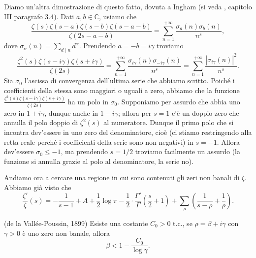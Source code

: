 Diamo un'altra dimostrazione di questo fatto, dovuta a Ingham (si veda \cite{T}, capitolo III paragrafo 3.4). Dati $a,b \in \mathbb{C}$, usiamo che
$$\frac{\zeta(s)\zeta(s-a)\zeta(s-b)\zeta(s-a-b)}{\zeta(2s-a-b)}=\sum_{n=1}^{+\infty} \frac{\sigma_a(n)\sigma_b(n)}{n^s},$$
dove $\displaystyle \sigma_{\alpha}(n)=\sum_{d \mid n} d^{\alpha}$. Prendendo $a=-b=i\gamma$ troviamo
$$\frac{\zeta^2(s)\zeta(s-i\gamma)\zeta(s+i\gamma)}{\zeta(2s)}=\sum_{n=1}^{+\infty} \frac{\sigma_{i\gamma}(n)\sigma_{-i\gamma}(n)}{n^s}=\sum_{n=1}^{+\infty} \frac{|\sigma_{i\gamma}(n)|^2}{n^s}.$$
Sia $\sigma_0$ l'ascissa di convergenza dell'ultima serie che abbiamo scritto. Poiché i coefficienti della stessa sono maggiori o uguali a zero, abbiamo che la funzione $\frac{\zeta^2(s)\zeta(s-i\gamma)\zeta(s+i\gamma)}{\zeta(2s)}$ ha un polo in $\sigma_0$. Supponiamo per assurdo che abbia uno zero in $1+i\gamma$, dunque anche in $1-i\gamma$; allora per $s=1$ c'è un doppio zero che annulla il polo doppio di $\zeta^2(s)$ al numeratore. Dunque il primo polo che si incontra dev'essere in uno zero del denominatore, cioè (ci stiamo restringendo alla retta reale perché i coefficienti della serie sono non negativi) in $s=-1$. Allora dev'essere $\sigma_0 \le -1$, ma prendendo $s=1/2$ troviamo facilmente un assurdo (la funzione si annulla grazie al polo al denominatore, la serie no).

Andiamo ora a cercare una regione in cui sono contenuti gli zeri non banali di $\zeta$. Abbiamo già visto che
$$\frac{\zeta'}{\zeta}(s)=-\frac{1}{s-1}+A+\frac{1}{2}\log{\pi}-\frac{1}{2}\cdot\frac{\Gamma'}{\Gamma}\left(\frac{s}{2}+1\right)+\sum_{\rho}\left(\frac{1}{s-\rho}+\frac{1}{\rho}\right).$$

\begin{prop}
  (de la Vallée-Poussin, 1899) Esiste una costante $C_0>0$ t.c., se $\rho=\beta+i\gamma$ con $\gamma>0$ è uno zero non banale, allora
  \begin{equation}
    \beta<1-\frac{C_0}{\log{\gamma}}.
  \end{equation}
\end{prop}

